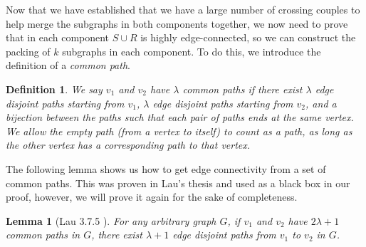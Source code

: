 \documentclass{article}
\newtheorem{lemma}{Lemma}[section]
\newtheorem{definition}{Definition}[section]
\begin{document}



Now that we have established that we have a large number of crossing couples to help merge the subgraphs in both components together, we now need to prove that in each component $S \cup R$ is highly edge-connected, so we can construct the packing of $k$ subgraphs in each component. To do this, we introduce the definition of a \emph{common path}.

\begin{definition}
    We say $v_1$ and $v_2$ have $\lambda$ \emph{common paths} if there exist $\lambda$ edge disjoint paths starting from $v_1$, $\lambda$ edge disjoint paths starting from $v_2$, and a bijection between the paths such that each pair of paths ends at the same vertex. We allow the empty path (from a vertex to itself) to count as a path, as long as the other vertex has a corresponding path to that vertex. 
\end{definition}

The following lemma shows us how to get edge connectivity from a set of common paths. This was proven in Lau's thesis and used as a black box in our proof, however, we will prove it again for the sake of completeness.

\begin{lemma}[Lau 3.7.5 \cite{lau-thesis}]\label{lem:commonconn}
    For any arbitrary graph $G$, if $v_1$ and $v_2$ have $2\lambda+1$ common paths in $G$, there exist $\lambda+1$ edge disjoint paths from $v_1$ to $v_2$ in $G$. 
\end{lemma}
\end{document}
